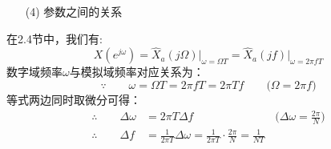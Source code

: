 \documentclass[notheorems,compress,mathserif,table]{beamer}
\begin{document}
%  
%  
%  


\begin{frame}[shrink]\frametitle{}%
\begin{enumerate}
	\item [(4)]参数之间的关系 
\end{enumerate}      
\qquad 在2.4节中，我们有:
$$X(e^{j\omega})= \hat{X}_a(j\Omega)\big|_{\omega = \Omega T} = \hat{X}_a(jf)\big|_{\omega = 2\pi fT}$$
\qquad 数字域频率$ \omega $与模拟域频率对应关系为：
$$\because\qquad \omega      = \Omega T = 2\pi f T =2\pi T f \qquad\big(\Omega = 2\pi f \big) $$
\qquad 等式两边同时取微分可得：
\begin{equation*}
\begin{split}
\therefore\qquad   \Delta\omega &=  2\pi T\Delta f  \qquad\qquad\qquad\quad\;    \big(\Delta\omega = \frac{2\pi}{N}\big)\\
\therefore\qquad   \Delta f     &=  \frac{1}{2\pi T} \Delta\omega 
=  \frac{1}{2\pi T}\cdot \frac{2\pi}{N} = \frac{1}{NT}
\end{split}
\end{equation*}
\end{frame}
\end{document}

